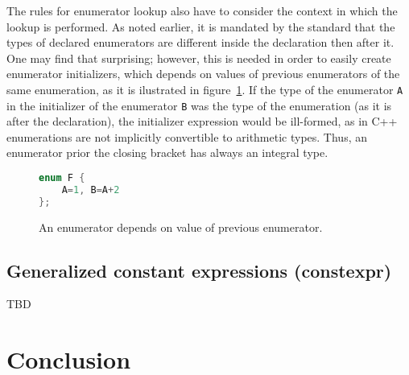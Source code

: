 \documentclass{fithesis3}
\begin{document}
The rules for enumerator lookup also have to consider the context in which the lookup is performed. As noted earlier, it is mandated by the standard that the types of declared enumerators are different inside the declaration then after it. One may find that surprising; however, this is needed in order to easily create enumerator initializers, which depends on values of previous enumerators of the same enumeration, as it is ilustrated in figure~\ref{lst:enumDepends}. If the type of the enumerator \lstinline{A} in the initializer of the enumerator \lstinline{B} was the type of the enumeration (as it is after the declaration), the initializer expression would be ill-formed, as in C++ enumerations are not implicitly convertible to arithmetic types. Thus, an enumerator prior the closing bracket has always an integral type.



\begin{figure}[h]
\begin{lstlisting}[language=C++]
enum F {
	A=1, B=A+2
};
\end{lstlisting}
\caption{An enumerator depends on value of previous enumerator.}
\label{lst:enumDepends}
\end{figure}





\section{Generalized constant expressions (constexpr)}
TBD

\chapter{Conclusion}
	
\end{document}
